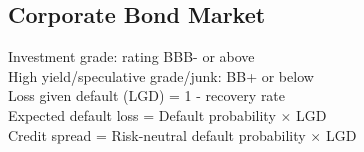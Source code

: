 	\subsection*{Corporate Bond Market}
	Investment grade: rating BBB- or above\\
	High yield/speculative grade/junk: BB+ or below\\
	Loss given default (LGD) = 1 - recovery rate\\
	Expected default loss = Default probability $\times$ LGD\\
	Credit spread = Risk-neutral default probability $\times$ LGD
